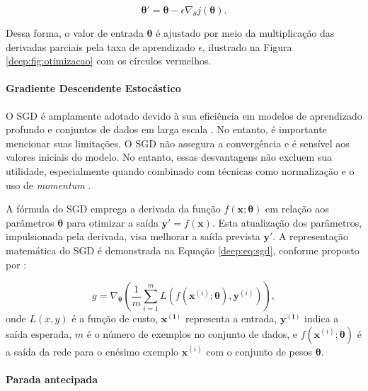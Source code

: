 \begin{equation}
    \label{deep:eq:graddesc}
    \boldsymbol{\theta}' = \boldsymbol{\theta} - \epsilon \nabla_{\boldsymbol{}{\theta}} j(\boldsymbol{\theta}).
\end{equation}

Dessa forma, o valor de entrada $\boldsymbol{\theta}$ é ajustado por meio da multiplicação das derivadas parciais pela taxa de aprendizado $\epsilon$, ilustrado na Figura \ref{deep:fig:otimizacao} com os círculos vermelhos.

\paragraph{Gradiente Descendente Estocástico}
\label{deep:optimization:sgd}
O SGD é amplamente adotado devido à sua eficiência em modelos de aprendizado profundo e conjuntos de dados em larga escala \citep{Goodfellow2016}. No entanto, é importante mencionar suas limitações. O SGD não assegura a convergência e é sensível aos valores iniciais do modelo. No entanto, essas desvantagens não excluem sua utilidade, especialmente quando combinado com técnicas como normalização e o uso de \textit{momentum} \citep{Goodfellow2016}.

A fórmula do SGD emprega a derivada da função $f(\boldsymbol{x}; \boldsymbol{\theta})$ em relação aos parâmetros $\boldsymbol{\theta}$ para otimizar a saída $\boldsymbol{y'} = f(\boldsymbol{x})$. Esta atualização dos parâmetros, impulsionada pela derivada, visa melhorar a saída prevista $\boldsymbol{y'}$. A representação matemática do SGD é demonstrada na Equação \ref{deep:eq:sgd}, conforme proposto por \cite{Goodfellow2016}:

\begin{equation}
\label{deep:eq:sgd}
g = \nabla_{\boldsymbol{\theta}} \left(\frac{1}{m} \sum\limits_{i=1}^{m}L(f(\boldsymbol{x}^{(i)}; \boldsymbol{\theta}), \mathbf{y}^{(i)})\right),
\end{equation}
onde $L(x,y)$ é a função de custo, $\boldsymbol{x^{(i)}}$ representa a entrada, $\boldsymbol{y^{(i)}}$ indica a saída esperada, $m$ é o número de exemplos no conjunto de dados, e $f(\boldsymbol{x}^{(i)}; \boldsymbol{\theta})$ é a saída da rede para o enésimo exemplo $\boldsymbol{x}^{(i)}$ com o conjunto de pesos $\boldsymbol{\theta}$.

\paragraph{Parada antecipada}
\label{deep:optimization:early_stoping}

